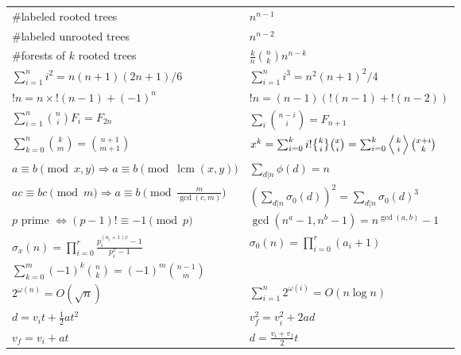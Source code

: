 \documentclass[8pt,a4paper,landscape,oneside]{amsart}
\DeclareMathOperator{\lcm}{lcm}
\DeclareRobustCommand{\stirling}{\genfrac\{\}{0pt}{}}
\begin{document}
\begin{multicols*}{3}
    \vspace{10pt}
    \begin{tabular}{ll}
        \#labeled rooted trees & $n^{n-1}$ \\
        \#labeled unrooted trees & $n^{n-2}$ \\
        \#forests of $k$ rooted trees & $\frac{k}{n}\binom{n}{k}n^{n-k}$ \\
        $\sum_{i=1}^n i^2 = n(n+1)(2n+1)/6$ & $\sum_{i=1}^n i^3 = n^2(n+1)^2/4$ \\
        $!n = n\times!(n-1)+(-1)^n$ & $!n = (n-1)(!(n-1)+!(n-2))$ \\
        $\sum_{i=1}^n \binom{n}{i} F_i = F_{2n}$ & $\sum_{i} \binom{n-i}{i} = F_{n+1}$ \\
        $\sum_{k=0}^n \binom{k}{m} = \binom{n+1}{m+1}$ & $x^k = \sum_{i=0}^k i!\stirling{k}{i}\binom{x}{i} = \sum_{i=0}^k \left\langle {k \atop i} \right\rangle\binom{x+i}{k}$ \\

        $a\equiv b\pmod{x,y} \Rightarrow a\equiv b\pmod{\lcm(x,y)}$ & $\sum_{d|n} \phi(d) = n$ \\
        $ac\equiv bc\pmod{m} \Rightarrow a\equiv b\pmod{\frac{m}{\gcd(c,m)}}$ & $(\sum_{d|n} \sigma_0(d))^2 = \sum_{d|n} \sigma_0(d)^3$ \\
        $p$ prime $\Leftrightarrow (p-1)!\equiv -1\pmod{p}$ & $\gcd(n^a-1,n^b-1) = n^{\gcd(a,b)}-1$ \\
        $\sigma_x(n) = \prod_{i=0}^{r} \frac{p_i^{(a_i + 1)x} - 1}{p_i^x - 1}$ & $\sigma_0(n) = \prod_{i=0}^r (a_i + 1)$ \\
        $\sum_{k=0}^m (-1)^k \binom{n}{k} = (-1)^m \binom{n-1}{m}$ & \\
        $2^{\omega(n)} = O(\sqrt{n})$ & $\sum_{i=1}^n 2^{\omega(i)} = O(n \log n)$ \\
        $d = v_i t + \frac{1}{2}at^2$ & $v_f^2 = v_i^2 + 2ad$ \\
        $v_f = v_i + at$ & $d = \frac{v_i + v_f}{2}t$ \\
    \end{tabular}

\end{multicols*}
\end{document}
